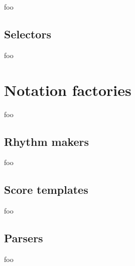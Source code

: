 foo

\subsection{Selectors}

foo

\section{Notation factories}

foo

\subsection{Rhythm makers}

foo

\subsection{Score templates}

foo

\subsection{Parsers}

foo